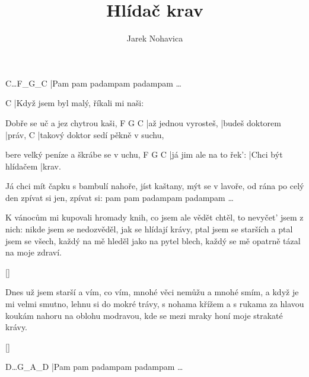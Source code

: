 \documentclass{song}
\title{Hlídač krav}
\author{Jarek Nohavica}
\begin{document}
\strophe
C\quad\ldots\quad F_G_C
|Pam pam padampam padampam \ldots
\endstrophe

\strophe
C
|Když jsem byl malý, říkali mi naši:

Dobře se uč a jez chytrou kaši,
F                    G               C
|až jednou vyrosteš, |budeš doktorem |práv,
C
|takový doktor sedí pěkně v suchu,

bere velký peníze a škrábe se v uchu,
F                       G                  C
|já jim ale na to řek': |Chci být hlídačem |krav.
\endstrophe

Já chci mít čapku s bambulí nahoře,
jíst kaštany, mýt se v lavoře,
od rána po celý den zpívat si jen,
zpívat si: pam pam padampam padampam \ldots
\endstrophe

\strophe*
K vánocům mi kupovali hromady knih,
co jsem ale vědět chtěl, to nevyčet' jsem z nich:
nikde jsem se nedozvěděl, jak se hlídají krávy,
ptal jsem se starších a ptal jsem se všech,
každý na mě hleděl jako na pytel blech,
každý se mě opatrně tázal na moje zdraví.
\endstrophe

\ref{}

\strophe*
Dnes už jsem starší a vím, co vím,
mnohé věci nemůžu a mnohé smím,
a když je mi velmi smutno, lehnu si do mokré trávy,
s nohama křížem a s rukama za hlavou
koukám nahoru na oblohu modravou,
kde se mezi mraky honí moje strakaté krávy.
\endstrophe

\ref{}

\strophe
D\quad\ldots\quad G_A_D
|Pam pam padampam padampam \ldots
\endstrophe
\end{document}
